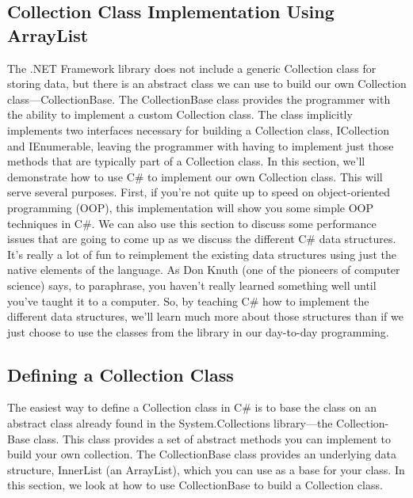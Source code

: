 \documentclass[12pt,a4paper,final,twoside,titlepage]{book}
\begin{document}
\subsection{Collection Class Implementation Using ArrayList}
The .NET Framework library does not include a generic Collection class for storing data, but there is an abstract class we can use to build our own Collection class—CollectionBase. The CollectionBase class provides the programmer with the ability to implement a custom Collection class. The class implicitly implements two interfaces necessary for building a Collection class, ICollection and IEnumerable, leaving the programmer with having to implement just those methods that are typically part of a Collection class.
In this section, we’ll demonstrate how to use C\# to implement our own Collection class. This will serve several purposes. First, if you’re not quite up to speed on object-oriented programming (OOP), this implementation will show you some simple OOP techniques in C\#. We can also use this section to discuss some performance issues that are going to come up as we discuss the different C\# data structures. It’s really a lot of fun to reimplement the existing data structures using just the native elements of the language. As Don Knuth (one of the pioneers of computer science) says, to paraphrase, you haven’t really learned something well until you’ve taught it to a computer. So, by teaching C\# how to implement the different data structures, we’ll learn much more about those structures than if we just choose to use the classes from the library in our day-to-day programming.
\subsection{Defining a Collection Class}
The easiest way to define a Collection class in C\# is to base the class on an abstract class already found in the System.Collections library—the Collection- Base class. This class provides a set of abstract methods you can implement to build your own collection. The CollectionBase class provides an underlying data structure, InnerList (an ArrayList), which you can use as a base for your class. In this section, we look at how to use CollectionBase to build a Collection class.
\end{document}
